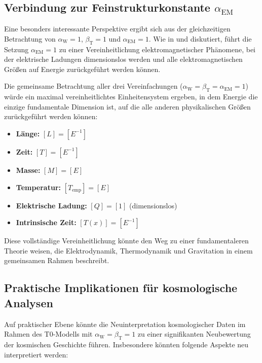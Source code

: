 \documentclass[12pt,a4paper]{article}
\newcommand{\Tfield}{T(x)}
\newcommand{\betaT}{\beta_{\text{T}}}
\newcommand{\alphaEM}{\alpha_{\text{EM}}}
\newcommand{\alphaW}{\alpha_{\text{W}}}
\begin{document}
	\subsection{Verbindung zur Feinstrukturkonstante \(\alphaEM\)}
	
	Eine besonders interessante Perspektive ergibt sich aus der gleichzeitigen Betrachtung von \(\alphaW = 1\), \(\betaT = 1\) und \(\alphaEM = 1\). Wie in \cite{pascher_alpha_2025} und \cite{pascher_alphabeta_2025} diskutiert, führt die Setzung \(\alphaEM = 1\) zu einer Vereinheitlichung elektromagnetischer Phänomene, bei der elektrische Ladungen dimensionslos werden und alle elektromagnetischen Größen auf Energie zurückgeführt werden können.
	
	Die gemeinsame Betrachtung aller drei Vereinfachungen (\(\alphaW = \betaT = \alphaEM = 1\)) würde ein maximal vereinheitlichtes Einheitensystem ergeben, in dem Energie die einzige fundamentale Dimension ist, auf die alle anderen physikalischen Größen zurückgeführt werden können:
	
	\begin{tcolorbox}[colback=blue!5!white,colframe=blue!75!black,title=Vollständig vereinheitlichtes Einheitensystem]
		\begin{itemize}
			\item \textbf{Länge:} \([L] = [E^{-1}]\)
			\item \textbf{Zeit:} \([T] = [E^{-1}]\)
			\item \textbf{Masse:} \([M] = [E]\)
			\item \textbf{Temperatur:} \([T_{\text{emp}}] = [E]\)
			\item \textbf{Elektrische Ladung:} \([Q] = [1]\) (dimensionslos)
			\item \textbf{Intrinsische Zeit:} \([\Tfield] = [E^{-1}]\)
		\end{itemize}
	\end{tcolorbox}
	
	Diese vollständige Vereinheitlichung könnte den Weg zu einer fundamentaleren Theorie weisen, die Elektrodynamik, Thermodynamik und Gravitation in einem gemeinsamen Rahmen beschreibt.
	
	\subsection{Praktische Implikationen für kosmologische Analysen}
	
	Auf praktischer Ebene könnte die Neuinterpretation kosmologischer Daten im Rahmen des T0-Modells mit \(\alphaW = \betaT = 1\) zu einer signifikanten Neubewertung der kosmischen Geschichte führen. Insbesondere könnten folgende Aspekte neu interpretiert werden:
	
\end{document}

